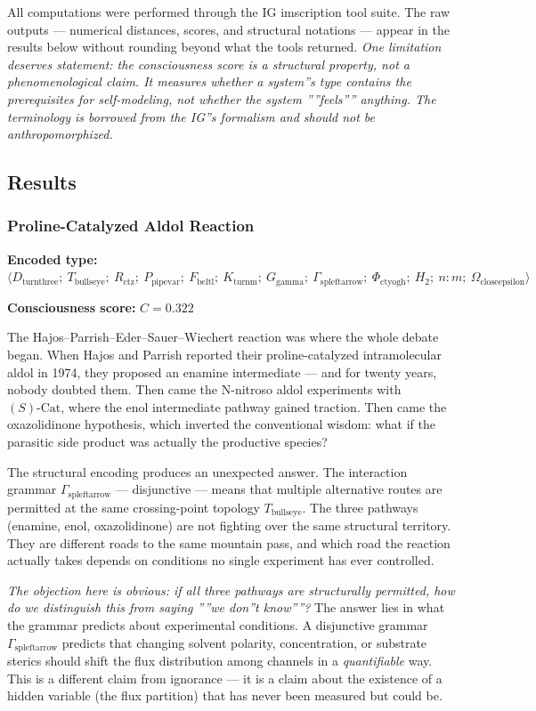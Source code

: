\documentclass[12pt,a4paper]{article}
\begin{document}
All computations were performed through the IG imscription tool suite. The raw outputs --- numerical distances, scores, and structural notations --- appear in the results below without rounding beyond what the tools returned. \emph{One limitation deserves statement: the consciousness score is a structural property, not a phenomenological claim. It measures whether a system''s type contains the prerequisites for self-modeling, not whether the system ''''feels'''' anything. The terminology is borrowed from the IG''s formalism and should not be anthropomorphized.}

\subsection{Results}

\subsubsection{Proline-Catalyzed Aldol Reaction}

\textbf{Encoded type:} $\langle D_{\text{turnthree}};\ T_{\text{bullseye}};\ R_{\text{ctz}};\ P_{\text{pipevar}};\ F_{\text{beltl}};\ K_{\text{turnm}};\ G_{\text{gamma}};\ \Gamma_{\text{spleftarrow}};\ \Phi_{\text{ctyogh}};\ H_2;\ n{:}m;\ \Omega_{\text{closeepsilon}} \rangle$

\textbf{Consciousness score:} $C = 0.322$

The Hajos--Parrish--Eder--Sauer--Wiechert reaction was where the whole debate began. When Hajos and Parrish reported their proline-catalyzed intramolecular aldol in 1974, they proposed an enamine intermediate --- and for twenty years, nobody doubted them. Then came the N-nitroso aldol experiments with $(S)\text{-Cat}$, where the enol intermediate pathway gained traction. Then came the oxazolidinone hypothesis, which inverted the conventional wisdom: what if the parasitic side product was actually the productive species?

The structural encoding produces an unexpected answer. The interaction grammar $\Gamma_{\text{spleftarrow}}$ --- disjunctive --- means that multiple alternative routes are permitted at the same crossing-point topology $T_{\text{bullseye}}$. The three pathways (enamine, enol, oxazolidinone) are not fighting over the same structural territory. They are different roads to the same mountain pass, and which road the reaction actually takes depends on conditions no single experiment has ever controlled.

\emph{The objection here is obvious: if all three pathways are structurally permitted, how do we distinguish this from saying ''''we don''t know''''?} The answer lies in what the grammar predicts about experimental conditions. A disjunctive grammar $\Gamma_{\text{spleftarrow}}$ predicts that changing solvent polarity, concentration, or substrate sterics should shift the flux distribution among channels in a \emph{quantifiable} way. This is a different claim from ignorance --- it is a claim about the existence of a hidden variable (the flux partition) that has never been measured but could be.
\end{document}
